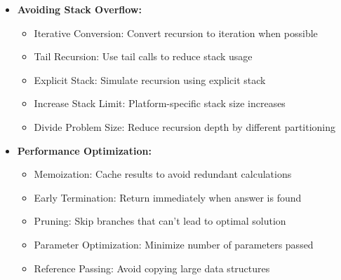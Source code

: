 \documentclass[a4paper,10pt]{book}
\begin{document}
\begin{itemize}[leftmargin=*]
    \item \textbf{Avoiding Stack Overflow:}
    \begin{itemize}
        \item Iterative Conversion: Convert recursion to iteration when possible
        \item Tail Recursion: Use tail calls to reduce stack usage
        \item Explicit Stack: Simulate recursion using explicit stack
        \item Increase Stack Limit: Platform-specific stack size increases
        \item Divide Problem Size: Reduce recursion depth by different partitioning
    \end{itemize}

    \item \textbf{Performance Optimization:}
    \begin{itemize}
        \item Memoization: Cache results to avoid redundant calculations
        \item Early Termination: Return immediately when answer is found
        \item Pruning: Skip branches that can't lead to optimal solution
        \item Parameter Optimization: Minimize number of parameters passed
        \item Reference Passing: Avoid copying large data structures
    \end{itemize}
\end{itemize}
\end{document}
